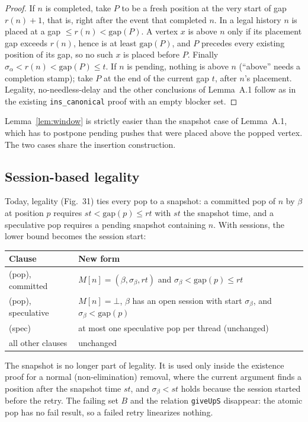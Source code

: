 \documentclass[11pt]{article}
\theoremstyle{definition}
\theoremstyle{remark}
\newcommand{\code}[1]{\texttt{#1}}
\newcommand{\sess}{\sigma}
\newcommand{\gap}{\mathrm{gap}}
\begin{document}
\begin{proof}
If $n$ is completed, take $P$ to be a fresh position at the very start of
gap $r(n)+1$, that is, right after the event that completed $n$. In a
legal history $n$ is placed at a gap $\le r(n) < \gap(P)$. A vertex $x$ is
above $n$ only if its placement gap exceeds $r(n)$, hence is at least
$\gap(P)$, and $P$ precedes every existing position of its gap, so no such
$x$ is placed before $P$. Finally $\sess_\alpha < r(n) < \gap(P) \le t$.
If $n$ is pending, nothing is above $n$ (``above'' needs a completion
stamp); take $P$ at the end of the current gap $t$, after $n$'s placement.
Legality, no-needless-delay and the other conclusions of Lemma~A.1 follow
as in the existing \code{ins\_canonical} proof with an empty blocker set.
\end{proof}

Lemma~\ref{lem:window} is strictly easier than the snapshot case of
Lemma~A.1, which has to postpone pending pushes that were placed above
the popped vertex. The two cases share the insertion construction.

\subsection{Session-based legality}

Today, legality (Fig.~31) ties every pop to a snapshot: a committed pop
of $n$ by $\beta$ at position $p$ requires $st < \gap(p) \le rt$ with
$st$ the snapshot time, and a speculative pop requires a pending snapshot
containing $n$. With sessions, the lower bound becomes the session start:

\begin{center}
\begin{tabular}{@{}ll@{}}
\toprule
Clause & New form \\
\midrule
(pop), committed & $M[n] = (\beta,\sess_\beta,rt)$ and $\sess_\beta < \gap(p) \le rt$ \\
(pop), speculative & $M[n]=\bot$, $\beta$ has an open session with start $\sess_\beta$, and $\sess_\beta < \gap(p)$ \\
(spec) & at most one speculative pop per thread (unchanged) \\
all other clauses & unchanged \\
\bottomrule
\end{tabular}
\end{center}

The snapshot is no longer part of legality. It is used only inside the
existence proof for a normal (non-elimination) removal, where the current
argument finds a position after the snapshot time $st$, and
$\sess_\beta < st$ holds because the session started before the retry.
The failing set $B$ and the relation \code{giveUpS} disappear: the atomic
pop has no fail result, so a failed retry linearizes nothing.
\end{document}

